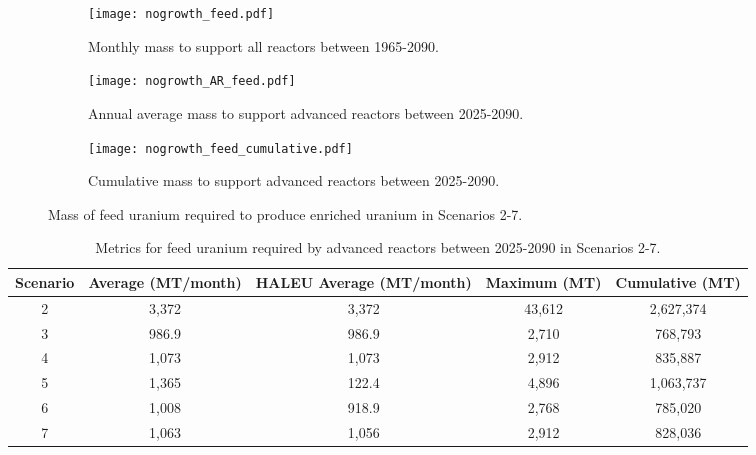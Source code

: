 \begin{figure}[h!]
    \centering
    \begin{subfigure}[b]{0.45\textwidth}
        \centering
        \texttt{[image: nogrowth\_feed.pdf]}
        \caption{Monthly mass to support all reactors between 1965-2090.}
        \label{fig:nogrowth_all_feed}
    \end{subfigure}
    \hfill
    \begin{subfigure}[b]{0.45\textwidth}
        \centering
        \texttt{[image: nogrowth\_AR\_feed.pdf]}
        \caption{Annual average mass to support
        advanced reactors between 2025-2090.}
        \label{fig:nogrowth_AR_feed}
    \end{subfigure}
    \begin{subfigure}[b]{0.45\textwidth}
        \centering
        \texttt{[image: nogrowth\_feed\_cumulative.pdf]}
        \caption{Cumulative mass to support advanced reactors between 2025-2090.}
        \label{fig:nogrowth_feed_cumulative}
    \end{subfigure}
       \caption{Mass of feed uranium required to produce enriched uranium
        in Scenarios 2-7.}
       \label{fig:nogrowth_feed}
\end{figure}

\begin{table}[h!]
    \centering 
    \caption{Metrics for feed uranium required by advanced reactors 
    between 2025-2090 in Scenarios 2-7.}
    \label{tab:nogrowth_feed}
    \begin{tabular}{c c c c c}
        \hline
        Scenario & Average (MT/month) & \gls{HALEU} Average 
        (MT/month) & Maximum (MT) & Cumulative (MT)\\\hline
        2 & 3,372 & 3,372 & 43,612 & 2,627,374\\
        3 & 986.9 & 986.9 & 2,710 & 768,793\\
        4 & 1,073 & 1,073 & 2,912 & 835,887\\
        5 & 1,365 & 122.4 & 4,896 & 1,063,737\\
        6 & 1,008 & 918.9 & 2,768 & 785,020\\
        7 & 1,063 & 1,056 & 2,912 & 828,036\\
        \hline
    \end{tabular}
\end{table}

